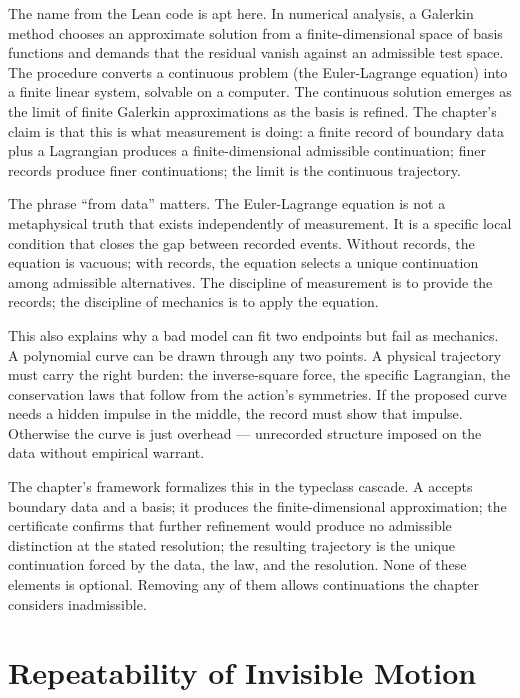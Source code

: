 The  name from the Lean code is apt here. In
numerical analysis, a Galerkin method chooses an approximate solution
from a finite-dimensional space of basis functions and demands that the
residual vanish against an admissible test space. The procedure converts
a continuous problem (the Euler-Lagrange equation) into a finite linear
system, solvable on a computer. The continuous solution emerges as the
limit of finite Galerkin approximations as the basis is refined. The
chapter's claim is that this is what measurement is doing: a finite
record of boundary data plus a Lagrangian produces a finite-dimensional
admissible continuation; finer records produce finer continuations; the
limit is the continuous trajectory.

The phrase ``from data'' matters. The Euler-Lagrange equation is not a
metaphysical truth that exists independently of measurement. It is a
specific local condition that closes the gap between recorded events.
Without records, the equation is vacuous; with records, the equation
selects a unique continuation among admissible alternatives. The
discipline of measurement is to provide the records; the discipline of
mechanics is to apply the equation.

This also explains why a bad model can fit two endpoints but fail as
mechanics. A polynomial curve can be drawn through any two points. A
physical trajectory must carry the right burden: the inverse-square
force, the specific Lagrangian, the conservation laws that follow from
the action's symmetries. If the proposed curve needs a hidden impulse
in the middle, the record must show that impulse. Otherwise the curve
is just overhead --- unrecorded structure imposed on the data without
empirical warrant.

The chapter's framework formalizes this in the typeclass cascade. A
 accepts boundary data and a basis; it produces the
finite-dimensional approximation; the  certificate
confirms that further refinement would produce no admissible distinction
at the stated resolution; the resulting trajectory is the unique
continuation forced by the data, the law, and the resolution. None of
these elements is optional. Removing any of them allows continuations
the chapter considers inadmissible.

\section{Repeatability of Invisible Motion}
\label{se:repeatability-of-invisible-motion}

